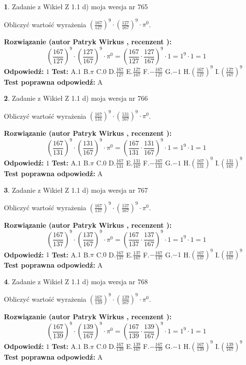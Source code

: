 \documentclass[12pt, a4paper]{article}
\theoremstyle{definition} %
\newtheorem{zad}{}
\newcommand{\zadStart}[1]{\begin{zad}#1\newline}
\newcommand{\zadStop}{\end{zad}}
\newcommand{\rozwStart}[2]{\noindent \textbf{Rozwiązanie (autor #1 , recenzent #2): }\newline}
\newcommand{\rozwStop}{\newline}
\newcommand{\odpStart}{\noindent \textbf{Odpowiedź:}\newline}
\newcommand{\odpStop}{\newline}
\newcommand{\testStart}{\noindent \textbf{Test:}\newline}
\newcommand{\testStop}{\newline}
\newcommand{\kluczStart}{\noindent \textbf{Test poprawna odpowiedź:}\newline}
\newcommand{\kluczStop}{\newline}
\begin{document}
\zadStart{Zadanie z Wikieł Z 1.1 d) moja wersja nr 765}

Obliczyć wartość wyrażenia $(\frac{167}{127})^{9} \cdot (\frac{127}{167})^{9} \cdot \pi^{0}$.
\zadStop
\rozwStart{Patryk Wirkus}{}
$$(\frac{167}{127})^{9} \cdot (\frac{127}{167})^{9} \cdot \pi^{0} = (\frac{167}{127} \cdot \frac{127}{167})^{9} \cdot 1 = 1^{9} \cdot 1 = 1$$
\rozwStop
\odpStart
$1$
\odpStop
\testStart
A.$1$ B.$\pi$ C.$0$ D.$\frac{167}{127}$ E.$\frac{127}{167}$
F.$-\frac{167}{127}$ G.$-1$
H.$(\frac{167}{127})^{9}$
I.$(\frac{127}{167})^{9}$
\testStop
\kluczStart
A
\kluczStop



\zadStart{Zadanie z Wikieł Z 1.1 d) moja wersja nr 766}

Obliczyć wartość wyrażenia $(\frac{167}{131})^{9} \cdot (\frac{131}{167})^{9} \cdot \pi^{0}$.
\zadStop
\rozwStart{Patryk Wirkus}{}
$$(\frac{167}{131})^{9} \cdot (\frac{131}{167})^{9} \cdot \pi^{0} = (\frac{167}{131} \cdot \frac{131}{167})^{9} \cdot 1 = 1^{9} \cdot 1 = 1$$
\rozwStop
\odpStart
$1$
\odpStop
\testStart
A.$1$ B.$\pi$ C.$0$ D.$\frac{167}{131}$ E.$\frac{131}{167}$
F.$-\frac{167}{131}$ G.$-1$
H.$(\frac{167}{131})^{9}$
I.$(\frac{131}{167})^{9}$
\testStop
\kluczStart
A
\kluczStop



\zadStart{Zadanie z Wikieł Z 1.1 d) moja wersja nr 767}

Obliczyć wartość wyrażenia $(\frac{167}{137})^{9} \cdot (\frac{137}{167})^{9} \cdot \pi^{0}$.
\zadStop
\rozwStart{Patryk Wirkus}{}
$$(\frac{167}{137})^{9} \cdot (\frac{137}{167})^{9} \cdot \pi^{0} = (\frac{167}{137} \cdot \frac{137}{167})^{9} \cdot 1 = 1^{9} \cdot 1 = 1$$
\rozwStop
\odpStart
$1$
\odpStop
\testStart
A.$1$ B.$\pi$ C.$0$ D.$\frac{167}{137}$ E.$\frac{137}{167}$
F.$-\frac{167}{137}$ G.$-1$
H.$(\frac{167}{137})^{9}$
I.$(\frac{137}{167})^{9}$
\testStop
\kluczStart
A
\kluczStop



\zadStart{Zadanie z Wikieł Z 1.1 d) moja wersja nr 768}

Obliczyć wartość wyrażenia $(\frac{167}{139})^{9} \cdot (\frac{139}{167})^{9} \cdot \pi^{0}$.
\zadStop
\rozwStart{Patryk Wirkus}{}
$$(\frac{167}{139})^{9} \cdot (\frac{139}{167})^{9} \cdot \pi^{0} = (\frac{167}{139} \cdot \frac{139}{167})^{9} \cdot 1 = 1^{9} \cdot 1 = 1$$
\rozwStop
\odpStart
$1$
\odpStop
\testStart
A.$1$ B.$\pi$ C.$0$ D.$\frac{167}{139}$ E.$\frac{139}{167}$
F.$-\frac{167}{139}$ G.$-1$
H.$(\frac{167}{139})^{9}$
I.$(\frac{139}{167})^{9}$
\testStop
\kluczStart
A
\kluczStop
\end{document}

